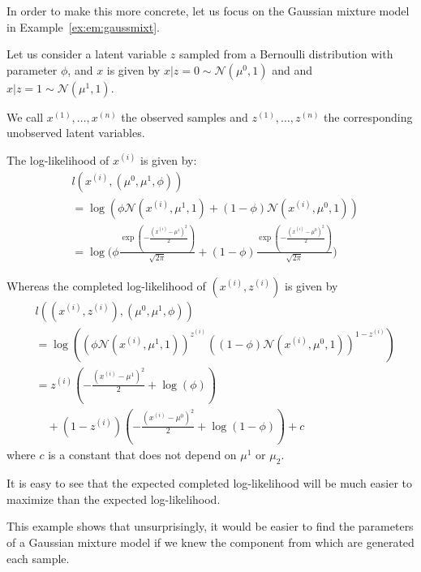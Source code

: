 In order to make this more concrete, let us focus on the Gaussian mixture model
in Example~\ref{ex:em:gaussmixt}.
\begin{example}
  \label{ex:em:gaussmixt}
  Let us consider a latent variable $z$
  sampled from a Bernoulli distribution with parameter $\phi$, 
  and $x$ is given by
  $x|z=0 \sim \mathcal{N}(\mu^0, 1)$ and 
  and $x | z=1 \sim \mathcal{N}(\mu^1, 1)$.

  We call $x^{(1)}, \dots, x^{(n)}$ the observed samples and $z^{(1)}, \dots,
  z^{(n)}$ the corresponding unobserved latent variables. 

  The log-likelihood of $x^{(i)}$ is given by:
  \begin{align}
    &l(x^{(i)}, (\mu^0, \mu^1, \phi)) \\ &= \log(\phi \mathcal{N}(x^{(i)}, \mu^1, 1) + (1 - \phi) \mathcal{N}(x^{(i)}, \mu^0, 1)) \\
                                                   &= \log\Big( \phi\frac{\exp(-\frac{(x^{(i)} - \mu^1)^2}{2})}{\sqrt{2 \pi}} + (1 - \phi)\frac{\exp(-\frac{(x^{(i)} - \mu^0)^2}{2})}{\sqrt{2 \pi}} \Big)
  \end{align}

  Whereas the completed log-likelihood of $(x^{(i)}, z^{(i)})$ is given by
  \begin{align}
    &l((x^{(i)}, z^{(i)}), (\mu^0, \mu^1, \phi)) \\
    &= \log((\phi \mathcal{N}(x^{(i)}, \mu^1, 1))^{z^{(i)}} ((1 - \phi) \mathcal{N}(x^{(i)}, \mu^0, 1))^{1- z^{(i)}}) \\
    &= z^{(i)} ( -\frac{(x^{(i)} - \mu^1)^2}{2} + \log(\phi)) \\ &\enspace \enspace + (1 - z^{(i)}) ( -\frac{(x^{(i)} - \mu^0)^2}{2} + \log(1 -\phi)) + c
  \end{align}
  where $c$ is a constant that does not depend on $\mu^1$ or $\mu_2$.

  It is easy to see that the expected completed log-likelihood will be
  much easier to maximize than the expected log-likelihood.
\end{example}
This example shows that unsurprisingly, it would be easier to find the parameters of a
Gaussian mixture model if we knew the component from which are generated each sample.

